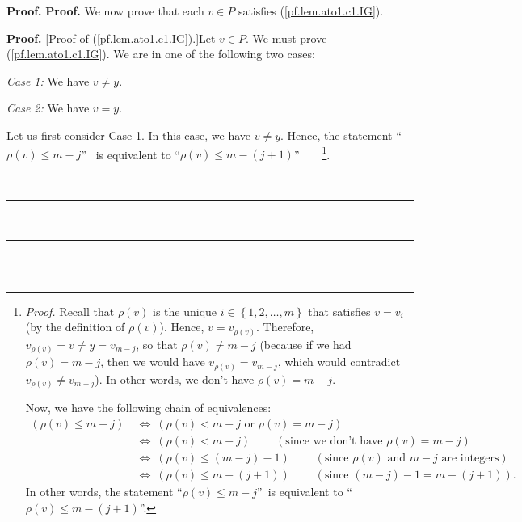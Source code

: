 \documentclass[numbers=enddot,12pt,final,onecolumn,notitlepage]{scrartcl}%
\theoremstyle{definition}
\newenvironment{verlong}{}{}
\newenvironment{proof}[1][Proof]{\noindent\textbf{#1.} }{\ \rule{0.5em}{0.5em}}
\begin{document}
\begin{verlong}
\begin{proof}
\begin{proof}
We now prove that each $v\in P$ satisfies (\ref{pf.lem.ato1.c1.IG}).

\begin{proof}
[Proof of (\ref{pf.lem.ato1.c1.IG}).]Let $v\in P$. We must prove
(\ref{pf.lem.ato1.c1.IG}). We are in one of the following two cases:

\textit{Case 1:} We have $v\neq y$.

\textit{Case 2:} We have $v=y$.

Let us first consider Case 1. In this case, we have $v\neq y$. Hence, the
statement \textquotedblleft$\rho\left(  v\right)  \leq m-j$\textquotedblright%
\ is equivalent to \textquotedblleft$\rho\left(  v\right)  \leq m-\left(
j+1\right)  $\textquotedblright\ \ \ \ \footnote{\textit{Proof.} Recall that
$\rho\left(  v\right)  $ is the unique $i\in\left\{  1,2,\ldots,m\right\}  $
that satisfies $v=v_{i}$ (by the definition of $\rho\left(  v\right)  $).
Hence, $v=v_{\rho\left(  v\right)  }$. Therefore, $v_{\rho\left(  v\right)
}=v\neq y=v_{m-j}$, so that $\rho\left(  v\right)  \neq m-j$ (because if we
had $\rho\left(  v\right)  =m-j$, then we would have $v_{\rho\left(  v\right)
}=v_{m-j}$, which would contradict $v_{\rho\left(  v\right)  }\neq v_{m-j}$).
In other words, we don't have $\rho\left(  v\right)  =m-j$.
\par
Now, we have the following chain of equivalences:%
\begin{align*}
\left(  \rho\left(  v\right)  \leq m-j\right)  \  &  \Longleftrightarrow
\ \left(  \rho\left(  v\right)  <m-j\text{ or }\rho\left(  v\right)
=m-j\right) \\
&  \Longleftrightarrow\ \left(  \rho\left(  v\right)  <m-j\right)
\ \ \ \ \ \ \ \ \ \ \left(  \text{since we don't have }\rho\left(  v\right)
=m-j\right) \\
&  \Longleftrightarrow\ \left(  \rho\left(  v\right)  \leq\left(  m-j\right)
-1\right)  \ \ \ \ \ \ \ \ \ \ \left(  \text{since }\rho\left(  v\right)
\text{ and }m-j\text{ are integers}\right) \\
&  \Longleftrightarrow\ \left(  \rho\left(  v\right)  \leq m-\left(
j+1\right)  \right)  \ \ \ \ \ \ \ \ \ \ \left(  \text{since }\left(
m-j\right)  -1=m-\left(  j+1\right)  \right)  .
\end{align*}
In other words, the statement \textquotedblleft$\rho\left(  v\right)  \leq
m-j$\textquotedblright\ is equivalent to \textquotedblleft$\rho\left(
v\right)  \leq m-\left(  j+1\right)  $\textquotedblright.}.


\end{proof}
\end{proof}
\end{proof}
\end{verlong}
\end{document}
